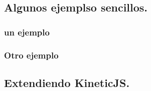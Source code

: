 \subsection{Algunos ejemplso sencillos.}

\subsubsection{un ejemplo}

\subsubsection{Otro ejemplo}


\subsection{Extendiendo KineticJS.}



